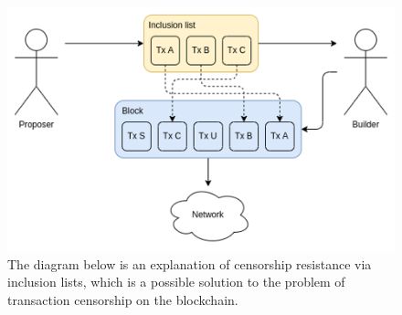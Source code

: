 \begin{center}
	\begin{figure}
		\centering
		\includegraphics[width=0.7\linewidth]{Fig/22/F8}
		\caption{The diagram below is an explanation of censorship resistance via inclusion lists, which is a possible solution to the problem of transaction censorship on the blockchain.}
		\label{fig:L22_f8}
	\end{figure}
\end{center}
